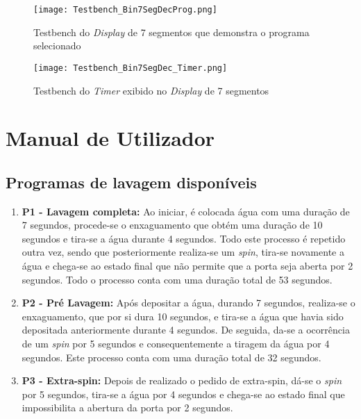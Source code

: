 \begin{figure} [H]
\centering
\texttt{[image: Testbench\_Bin7SegDecProg.png]}
\caption{Testbench do \textit{Display} de 7 segmentos que demonstra o programa selecionado}
\label{fig:test_controlPanel}
\end{figure}

\begin{figure} [H]
\centering
\texttt{[image: Testbench\_Bin7SegDec\_Timer.png]}
\caption{Testbench do \textit{Timer} exibido no \textit{Display} de 7 segmentos}
\label{fig:test_controlPanel}
\end{figure}



\chapter{Manual de Utilizador}	
\label{chap.manual}

\section{Programas de lavagem disponíveis}
\label{sec.programas}

\begin{enumerate}
	\item\textbf{P1 - Lavagem completa:} Ao iniciar, é colocada água com uma duração de 7 segundos, procede-se o enxaguamento que obtém uma duração de 10 segundos e tira-se a água durante 4 segundos. Todo este processo é repetido outra vez, sendo que posteriormente realiza-se um \emph{spin}, tira-se novamente a água e chega-se ao estado final que não permite que a porta seja aberta por 2 segundos. Todo o processo conta com uma duração total de 53 segundos.
	

	\item\textbf{P2 - Pré Lavagem:} Após depositar a água, durando 7 segundos, realiza-se o enxaguamento, que por si dura 10 segundos, e tira-se a água que havia sido depositada anteriormente durante 4 segundos. De seguida, da-se a ocorrência de um \emph{spin} por 5 segundos e consequentemente a tiragem da água por 4 segundos. Este processo conta com uma duração total de 32 segundos.


	\item\textbf{P3 - Extra-spin:} Depois de realizado o pedido de extra-spin, dá-se o \emph{spin} por 5 segundos, tira-se a água por 4 segundos e chega-se ao estado final que impossibilita a abertura da porta por 2 segundos.
\end{enumerate}


